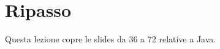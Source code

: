 \documentclass{article}
\begin{document}
\section{Ripasso}
Questa lezione copre le slides da 36 a 72 relative a Java.
%
%
%
%
\end{document}
